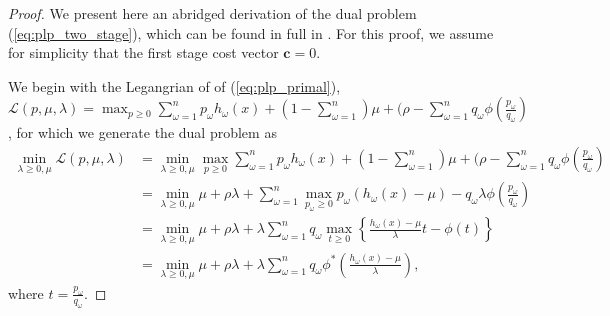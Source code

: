 \documentclass[ijoc,nonblindrev]{informs3} %
\renewcommand{\c}{\mathbf{c}}
\begin{document}
\begin{proof}
	We present here an abridged derivation of the dual problem (\ref{eq:plp_two_stage}), which can be found in full in \cite{bental2011robust}.
	For this proof, we assume for simplicity that the first stage cost vector $\c = 0$.
	
	We begin with the Legangrian of of (\ref{eq:plp_primal}), $\mathcal{L}(p,\mu,\lambda) = \max_{p \geq 0} \sum_{\omega=1}^n p_\omega h_\omega(x) + (1-\sum_{\omega=1}^n)\mu + (\rho - \sum_{\omega=1}^n q_\omega \phi\left(\frac{p_\omega}{q_\omega}\right)$, for which we generate the dual problem as
	\begin{align}
		\min_{\lambda \geq 0, \mu} \mathcal{L}(p,\mu,\lambda) & = \min_{\lambda \geq 0, \mu} \max_{p \geq 0} \sum_{\omega=1}^n p_\omega h_\omega(x) + (1-\sum_{\omega=1}^n)\mu + (\rho - \sum_{\omega=1}^n q_\omega \phi\left(\frac{p_\omega}{q_\omega}\right) \nonumber \\
		& = \min_{\lambda \geq 0, \mu} \mu + \rho\lambda + \sum_{\omega=1}^n \max_{p_\omega \geq 0} p_\omega (h_\omega(x) - \mu) - q_\omega \lambda \phi\left(\frac{p_\omega}{q_\omega}\right) \label{eq:pop_proof_detail_1} \\
		& = \min_{\lambda \geq 0, \mu} \mu + \rho\lambda + \lambda \sum_{\omega=1}^n q_\omega \max_{t \geq 0} \left\{ \frac{h_\omega(x) - \mu}{\lambda} t - \phi(t) \right\} \label{eq:pop_proof_detail_2} \\
		& = \min_{\lambda \geq 0, \mu} \mu + \rho\lambda + \lambda \sum_{\omega=1}^n q_\omega \phi^*\left(\frac{h_\omega(x) - \mu}{\lambda}\right), \nonumber
	\end{align}
	where $t = \frac{p_\omega}{q_\omega}$.
	

\end{proof}
\end{document}
